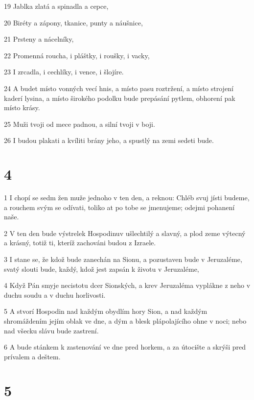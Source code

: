 \par 19 Jablka zlatá a spinadla a cepce,
\par 20 Biréty a zápony, tkanice, punty a náušnice,
\par 21 Prsteny a nácelníky,
\par 22 Promenná roucha, i pláštky, i roušky, i vacky,
\par 23 I zrcadla, i cechlíky, i vence, i šlojíre.
\par 24 A budet místo vonných vecí hnis, a místo pasu roztržení, a místo strojení kaderí lysina, a místo širokého podolku bude prepásání pytlem, obhorení pak místo krásy.
\par 25 Muži tvoji od mece padnou, a silní tvoji v boji.
\par 26 I budou plakati a kvíliti brány jeho, a spustlý na zemi sedeti bude.

\chapter{4}

\par 1 I chopí se sedm žen muže jednoho v ten den, a reknou: Chléb svuj jísti budeme, a rouchem svým se odívati, toliko at po tobe se jmenujeme; odejmi pohanení naše.
\par 2 V ten den bude výstrelek Hospodinuv ušlechtilý a slavný, a plod zeme výtecný a krásný, totiž ti, kteríž zachováni budou z Izraele.
\par 3 I stane se, že kdož bude zanechán na Sionu, a pozustaven bude v Jeruzaléme, svatý slouti bude, každý, kdož jest zapsán k životu v Jeruzaléme,
\par 4 Když Pán smyje necistotu dcer Sionských, a krev Jeruzaléma vyplákne z neho v duchu soudu a v duchu horlivosti.
\par 5 A stvorí Hospodin nad každým obydlím hory Sion, a nad každým shromáždením jejím oblak ve dne, a dým a blesk plápolajícího ohne v noci; nebo nad všecku slávu bude zastrení.
\par 6 A bude stánkem k zastenování ve dne pred horkem, a za útocište a skrýši pred prívalem a deštem.

\chapter{5}

